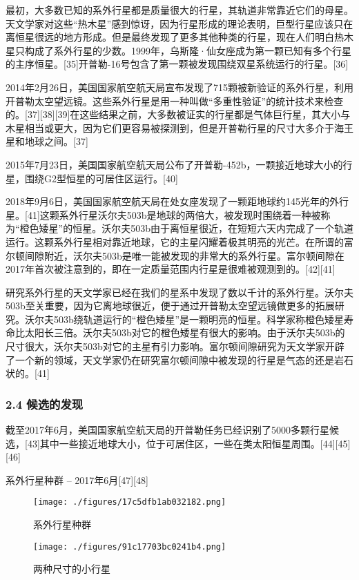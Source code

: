 最初，大多数已知的系外行星都是质量很大的行星，其轨道非常靠近它们的母星。天文学家对这些“热木星”感到惊讶，因为行星形成的理论表明，巨型行星应该只在离恒星很远的地方形成。但是最终发现了更多其他种类的行星，现在人们明白热木星只构成了系外行星的少数。1999年，乌斯隆·仙女座成为第一颗已知有多个行星的主序恒星。[35]开普勒-16号包含了第一颗被发现围绕双星系统运行的行星。[36]

2014年2月26日，美国国家航空航天局宣布发现了715颗被新验证的系外行星，利用开普勒太空望远镜。这些系外行星是用一种叫做“多重性验证”的统计技术来检查的。[37][38][39]在这些结果之前，大多数被证实的行星都是气体巨行星，其大小与木星相当或更大，因为它们更容易被探测到，但是开普勒行星的尺寸大多介于海王星和地球之间。[37]

2015年7月23日，美国国家航空航天局公布了开普勒-452b，一颗接近地球大小的行星，围绕G2型恒星的可居住区运行。[40]

2018年9月6日，美国国家航空航天局在处女座发现了一颗距地球约145光年的外行星。[41]这颗系外行星沃尔夫503b是地球的两倍大，被发现时围绕着一种被称为“橙色矮星”的恒星。沃尔夫503b由于离恒星很近，在短短六天内完成了一个轨道运行。这颗系外行星相对靠近地球，它的主星闪耀着极其明亮的光芒。在所谓的富尔顿间隙附近，沃尔夫503b是唯一能被发现的非常大的系外行星。富尔顿间隙在2017年首次被注意到的，即在一定质量范围内行星是很难被观测到的。[42][41]

研究系外行星的天文学家已经在我们的星系中发现了数以千计的系外行星。沃尔夫503b至关重要，因为它离地球很近，便于通过开普勒太空望远镜做更多的拓展研究。沃尔夫503b绕轨道运行的“橙色矮星”是一颗明亮的恒星。科学家称橙色矮星寿命比太阳长三倍。沃尔夫503b对它的橙色矮星有很大的影响。由于沃尔夫503b的尺寸很大，沃尔夫503b对它的主星有引力影响。富尔顿间隙研究为天文学家开辟了一个新的领域，天文学家仍在研究富尔顿间隙中被发现的行星是气态的还是岩石状的。[41]
\subsubsection{2.4 候选的发现}
截至2017年6月，美国国家航空航天局的开普勒任务已经识别了5000多颗行星候选，[43]其中一些接近地球大小，位于可居住区，一些在类太阳恒星周围。[44][45][46]

系外行星种群 – 2017年6月[47][48]
\begin{figure}[ht]
\centering
\texttt{[image: ./figures/17c5dfb1ab032182.png]}
\caption{系外行星种群} \label{fig_TYXWXX_5}
\end{figure}
\begin{figure}[ht]
\centering
\texttt{[image: ./figures/91c17703bc0241b4.png]}
\caption{两种尺寸的小行星} \label{fig_TYXWXX_6}
\end{figure}